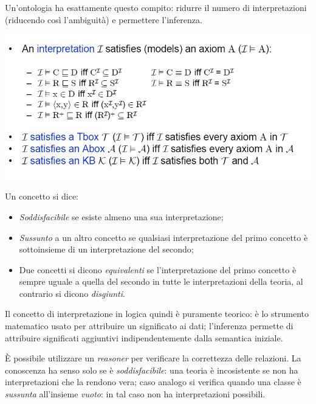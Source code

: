 \documentclass[11pt]{article}
\begin{document}
Un'ontologia ha esattamente questo compito: ridurre il numero di interpretazioni (riducendo così l'ambiguità) e permettere l'inferenza.
\begin{center}
\includegraphics[scale=0.65]{IMG5.png}
\end{center}
Un concetto si dice:
\begin{itemize}
\item \textit{Soddisfacibile} se esiste almeno una sua interpretazione; 
\item \textit{Sussunto} a un altro concetto se qualsiasi interpretazione del primo concetto è sottoinsieme di un interpretazione del secondo;
\item Due concetti si dicono \textit{equivalenti} se l'interpretazione del primo concetto è sempre uguale a quella del secondo in tutte le interpretazioni della teoria, al contrario si dicono \textit{disgiunti}.
\end{itemize}
Il concetto di interpretazione in logica quindi è puramente teorico: è lo strumento matematico usato per attribuire un significato ai dati; l'inferenza permette di attribuire significati aggiuntivi indipendentemente dalla semantica iniziale.

È possibile utilizzare un \textit{reasoner} per verificare la correttezza delle relazioni.
La conoscenza ha senso solo se è \textit{soddisfacibile}: una teoria è incosistente se non ha interpretazioni che la rendono vera; caso analogo si verifica quando una classe è \textit{sussunta} all'insieme \textit{vuoto}: in tal caso non ha interpretazioni possibili.
\end{document}
